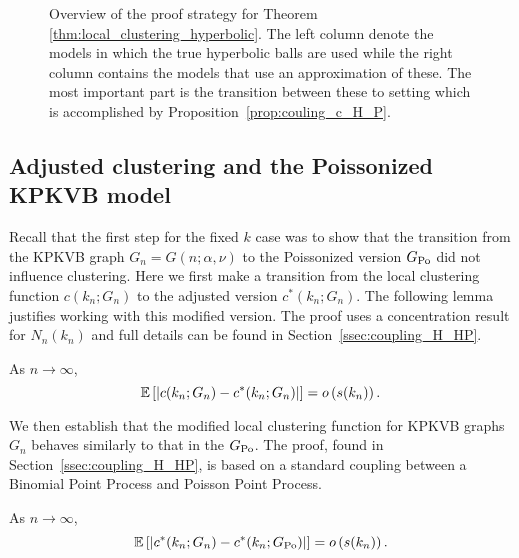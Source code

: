 \begin{figure}[!t]

\caption{Overview of the proof strategy for Theorem \ref{thm:local_clustering_hyperbolic}. The left column denote the models in which the true hyperbolic balls are used while the right column contains the models that use an approximation of these. The most important part is the transition between these to setting which is accomplished by Proposition~\ref{prop:couling_c_H_P}.}
\label{fig:overview_proof}
\end{figure}


\subsection{Adjusted clustering and the Poissonized KPKVB model}\label{ssec:KPKVB_to_GPo_infinite_k}

Recall that the first step for the fixed $k$ case was to show that the transition from the KPKVB graph $G_n = G(n;\alpha,\nu)$ to the Poissonized version $G_{{\mathrm{Po}}}$ did not influence clustering. Here we first make a transition from the local clustering function $c(k_n; G_n)$ to the adjusted version $c^\ast(k_n; G_n)$. The following lemma justifies working with this modified version. The proof uses a concentration result for $N_{n}(k_n)$ and full details can be found in Section~\ref{ssec:coupling_H_HP}.

\begin{lemma}\label{lem:clustering_ast_H}
As $n \to \infty$,
\[
	\mathbb{E}\left[\left|c(k_n;G_n) - c^\ast(k_n;G_n)\right|\right] = o\left(s(k_n)\right).
\]
\end{lemma}

We then establish that the modified local clustering function for KPKVB graphs $G_n$ behaves similarly to that in the $G_{{\mathrm{Po}}}$. The proof, found in Section~\ref{ssec:coupling_H_HP}, is based on a standard coupling between a Binomial Point Process and Poisson Point Process.

\begin{proposition}\label{prop:clustering_ast_H_Pois}
As $n \to \infty$,
\[
	\mathbb{E}\left[\left|c^\ast(k_n;G_n) - c^\ast(k_n; G_{{\mathrm{Po}}})\right|\right] = o\left(s(k_n)\right).
\]
\end{proposition}

